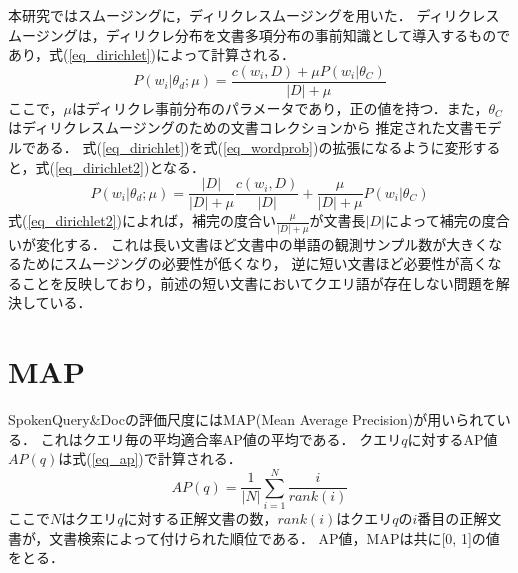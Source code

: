 本研究ではスムージングに，ディリクレスムージングを用いた．
ディリクレスムージングは，ディリクレ分布を文書多項分布の事前知識として導入するものであり，式(\ref{eq_dirichlet})によって計算される．
\begin{equation}
    P(w_i|\theta_d;\mu) = \frac{ c(w_i, D) + \mu P(w_i|\theta_C) }{ |D| + \mu } \label{eq_dirichlet}
\end{equation}
ここで，$\mu$はディリクレ事前分布のパラメータであり，正の値を持つ．また，$\theta_C$はディリクレスムージングのための文書コレクションから
推定された文書モデルである．
式(\ref{eq_dirichlet})を式(\ref{eq_wordprob})の拡張になるように変形すると，式(\ref{eq_dirichlet2})となる．
\begin{equation}
    P(w_i|\theta_d;\mu) = \frac{|D|}{|D|+\mu} \frac{c(w_i, D)}{|D|} + \frac{\mu}{|D|+\mu}P(w_i|\theta_C)  \label{eq_dirichlet2}
\end{equation}
式(\ref{eq_dirichlet2})によれば，補完の度合い$\frac{\mu}{|D|+\mu}$が文書長$|D|$によって補完の度合いが変化する．
これは長い文書ほど文書中の単語の観測サンプル数が大きくなるためにスムージングの必要性が低くなり，
逆に短い文書ほど必要性が高くなることを反映しており，前述の短い文書においてクエリ語が存在しない問題を解決している．

\section{MAP} \label{sec_map}
SpokenQuery\&Docの評価尺度にはMAP(Mean Average Precision)が用いられている．
これはクエリ毎の平均適合率AP値の平均である．
クエリ$q$に対するAP値$AP(q)$は式(\ref{eq_ap})で計算される．
\begin{equation}
    AP(q) = \frac{1}{|N|} \sum^N_{i=1} \frac{i}{rank(i)}    \label{eq_ap}
\end{equation}
ここで$N$はクエリ$q$に対する正解文書の数，$rank(i)$はクエリ$q$の$i$番目の正解文書が，文書検索によって付けられた順位である．
AP値，MAPは共に[0, 1]の値をとる．
